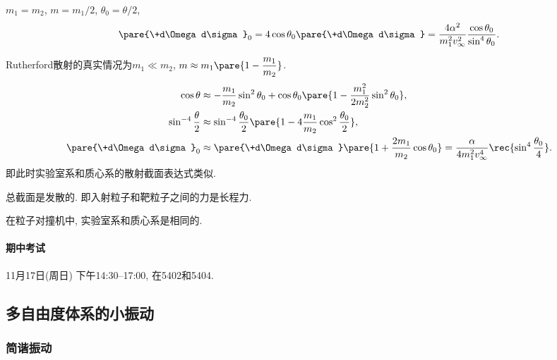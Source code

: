 \documentclass[../LectureNotes.tex]{subfiles}
\begin{document}
\begin{cenum}
    \item $m_1 = m_2$, $m = m_1/2$, $\theta_0 = \theta/2$,
    \[ \pare{\+d\Omega d\sigma}_0 = 4\cos\theta_0 \pare{\+d\Omega d\sigma} = \frac{4\alpha^2}{m_1^2v_\infty^2} \frac{\cos\theta_0}{\sin^4\theta_0}. \]
    \item Rutherford散射的真实情况为$m_1 \ll m_2$, $\displaystyle m \approx m_1 \pare{1-\frac{m_1}{m_2}}$.
    \begin{align*}
        \cos\theta &\approx -\frac{m_1}{m_2}\sin^2\theta_0 + \cos\theta_0 \pare{1-\frac{m_1^2}{2m_2^2}\sin^2\theta_0}, \\
        \sin^{-4}\frac{\theta}{2} &\approx \sin^{-4} \frac{\theta_0}{2}\pare{1-4\frac{m_1}{m_2}\cos^2 \frac{\theta_0}{2}}, \\
        \pare{\+d\Omega d\sigma}_0 &\approx \pare{\+d\Omega d\sigma}\pare{1+\frac{2m_1}{m_2}\cos\theta_0} = \frac{\alpha}{4m_1^2 v_\infty^4}\rec{\sin^4 \frac{\theta_0}{4}}.
    \end{align*}
    即此时实验室系和质心系的散射截面表达式类似.
\end{cenum}
\begin{remark}
    总截面是发散的. 即入射粒子和靶粒子之间的力是长程力.
\end{remark}
\begin{remark}
    在粒子对撞机中, 实验室系和质心系是相同的.
\end{remark}

\paragraph{期中考试} %
\label{par:期中考试}

11月17日(周日) 下午14:30--17:00, 在5402和5404.




\subsection{多自由度体系的小振动} %
\label{sub:多自由度体系的小振动}

\subsubsection{简谐振动} %
\label{ssub:简谐振动}
\end{document}
